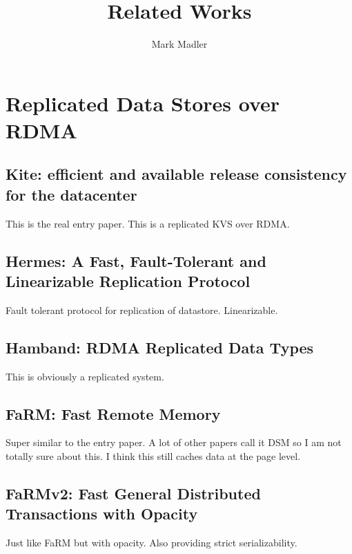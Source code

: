 \documentclass[sigplan,nonacm]{acmart}
\title{Related Works}
\author{Mark Madler}
\begin{document}
\maketitle


\section{Replicated Data Stores over RDMA}

    \subsection{Kite: efficient and available release consistency for the datacenter}
    This is the real entry paper. This is a replicated KVS over RDMA.\cite{Gavrielatos-PPoPP-2020}

    \subsection {Hermes: A Fast, Fault-Tolerant and Linearizable Replication Protocol}
    Fault tolerant protocol for replication of datastore. Linearizable. \cite{Katsarakis-ASPLOS-2020}

    \subsection {Hamband: RDMA Replicated Data Types}
    This is obviously a replicated system.\cite{Houshmand-PLDI-2022}

    \subsection{FaRM: Fast Remote Memory}
    Super similar to the entry paper. A lot of other papers call it DSM so 
    I am not totally sure about this. I think this still caches data at the page level.\cite{Dragojevic-NSDI-2014}

    \subsection{FaRMv2: Fast General Distributed Transactions with Opacity}
    Just like FaRM but with opacity. Also providing strict serializability.\cite{Shamis-SIGMOD-2019}
\end{document}
